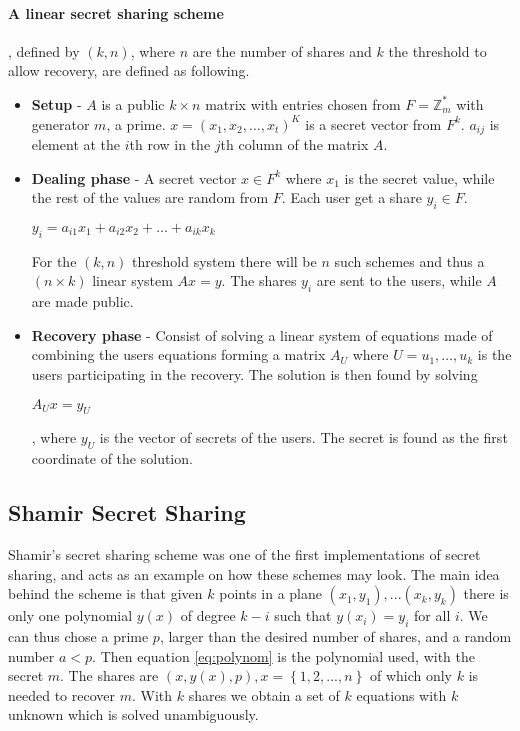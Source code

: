 \paragraph{A linear secret sharing scheme \cite{lsss}}, defined by $(k,n)$, where $n$ are the number of shares and $k$ the threshold to allow recovery, are defined as following.\\
\begin{itemize}
\item \textbf{Setup} -  $A$ is a public $k\times n$ matrix with entries chosen from $F = \mathbb{Z}_m^*$ with generator $m$, a prime. $x=(x_1,x_2,\dots,x_t)^K$ is a secret vector from $F^k$. $a_{ij}$ is element at the $i$th row in the $j$th column of the matrix $A$.
\item \textbf{Dealing phase} - A secret vector $x \in F^k$ where $x_1$ is the secret value, while the rest of the values are random from $F$. Each user get a share $y_i \in F$.
\centerline{$y_i = a_{i1}x_1 + a_{i2}x_2 + \dots + a_{ik}x_k$}
For the $(k,n)$ threshold system there will be $n$ such schemes and thus a $(n\times k)$ linear system $Ax=y$.
The shares $y_i$ are sent to the users, while $A$ are made public.
\item \textbf{Recovery phase} - Consist of solving a linear system of equations made of combining the users equations forming a matrix $A_U$ where $U = {u_1, \dots, u_k}$ is the users participating in the recovery. The solution is then found by solving 
\centerline{$A_Ux=y_U$}, where $y_U$ is the vector of secrets of the users. The secret is found as the first coordinate of the solution.
\end{itemize}

\subsection{Shamir Secret  Sharing}\label{sec:secret_sharing}
 Shamir's secret sharing scheme \cite{shamir_share} was one of the first implementations of secret sharing, and acts as an example on how these schemes may look. The main idea behind the scheme is that given $k$ points in a plane $(x_1,y_1), ... (x_k,y_k)$ there is only one polynomial $y(x)$ of degree $k-i$ such that $y(x_i) = y_i$ for all $i$. We can thus chose a prime $p$, larger than the desired number of shares, and a random number $a < p$. Then equation \ref{eq:polynom} is the polynomial used, with the secret $m$. The shares are $(x, y(x), p) , x=\left\{ {1,2, ... ,n}\right\}$ of which only $k$ is needed to recover $m$. With $k$ shares we obtain a set of $k$ equations with $k$ unknown which is solved unambiguously.

